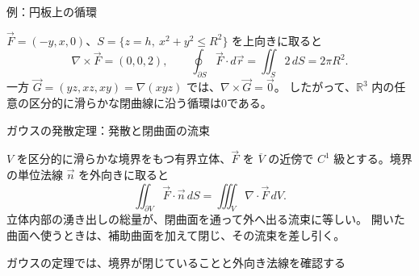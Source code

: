 \documentclass[a4paper,10pt,pdflatex,ja=standard,jafont=ipaex-type1,
  magstyle=real,scale=1]{bxjsarticle}
\newcommand{\topic}[1]{\par\vspace{5pt}%
  {\large\sffamily\mdseries\color{accent}#1}\par\vspace{2pt}}
\begin{document}
\topic{例：円板上の循環}
$\vec F=(-y,x,0)$、$S=\{z=h,\ x^2+y^2\le R^2\}$ を上向きに取ると
$$
 \nabla\times\vec F=(0,0,2),\qquad
 \oint_{\partial S}\vec F\cdot d\vec r
 =\iint_S2\,dS=2\pi R^2.
$$
一方 $\vec G=(yz,xz,xy)=\nabla(xyz)$ では、$\nabla\times\vec G=\vec0$。
したがって、$\mathbb R^3$ 内の任意の区分的に滑らかな閉曲線に沿う循環は0である。


\topic{ガウスの発散定理：発散と閉曲面の流束}
$V$ を区分的に滑らかな境界をもつ有界立体、$\vec F$ を $\overline V$ の近傍で
$C^1$ 級とする。境界の単位法線 $\vec n$ を外向きに取ると
$$
 \iint_{\partial V}\vec F\cdot\vec n\,dS
 =\iiint_V\nabla\cdot\vec F\,dV.
$$
立体内部の湧き出しの総量が、閉曲面を通って外へ出る流束に等しい。
開いた曲面へ使うときは、補助曲面を加えて閉じ、その流束を差し引く。


\par\vspace{2pt}\noindent
\begin{minipage}[b]{0.98\linewidth}\centering
{}\par
{\small\color{muted}ガウスの定理では、境界が閉じていることと外向き法線を確認する}\par
\end{minipage}
\par\vspace{2pt}
\end{document}
